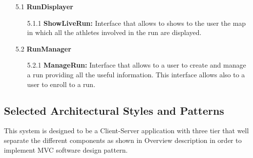 \begin{enumerate}
\item[5.1] \textbf{RunDisplayer}
	\begin{enumerate}
		\item[5.1.1] \textbf{ShowLiveRun:} Interface that allows to shows to the user the map in which all the athletes involved in the run are displayed.
	\end{enumerate}	

\item[5.2] \textbf{RunManager}
	\begin{enumerate}
		\item[5.2.1] \textbf{ManageRun:} Interface that allows to a user to create and manage a run providing all the useful information. This interface allows also to a user to enroll to a run.
	\end{enumerate}		
\clearpage
\end{enumerate}
\clearpage



\subsection{Selected Architectural Styles and Patterns}

This system is designed to be a Client-Server application with three tier that well separate the different components as shown in Overview description in order to implement MVC software design pattern.

